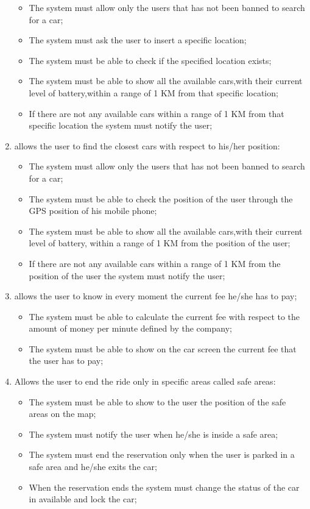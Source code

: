 \begin{enumerate}
\begin{itemize}
\item The system must allow only the users that has not been banned to search for a car;
\item The system must ask the user to insert a specific location;
\item The system must be able to check if the specified location exists;
\item The system must be able to show all the available cars,with their current level of battery,within a range of 1 KM from that specific location;
\item If there are not any available cars within a range of 1 KM from that specific location the system must notify the user;
\end{itemize}

\item allows the user to find the closest cars with respect to his/her position:

\begin{itemize}
\item The system must allow only the users that has not been banned to search for a car;
\item The system must be able to check the position of the user through the GPS position of his mobile phone;
\item The system must be able to show all the available cars,with their current level of battery, within a range of 1 KM from the position of the user;
\item If there are not any available cars within a range of 1 KM from the position of the user the system must notify the user;
\end{itemize}

\item allows the user to know in every moment the current fee he/she has to pay;

\begin{itemize}
\item The system must be able to calculate the current fee with respect to the amount of money per minute defined by the company;
\item The system must be able to show on the car screen the current fee that the user has to pay;
\end{itemize}

\item Allows the user to end the ride only in specific areas called safe areas:

\begin{itemize}
\item The system must be able to show to the user the position of the safe areas on the map;
\item The system must notify the user when he/she is inside a safe area;
\item The system must end the reservation only when the user is parked in a safe area and he/she exits the car;
\item When the reservation ends the system must change the status of the car in available and lock the car;
\end{itemize}


\end{enumerate}
